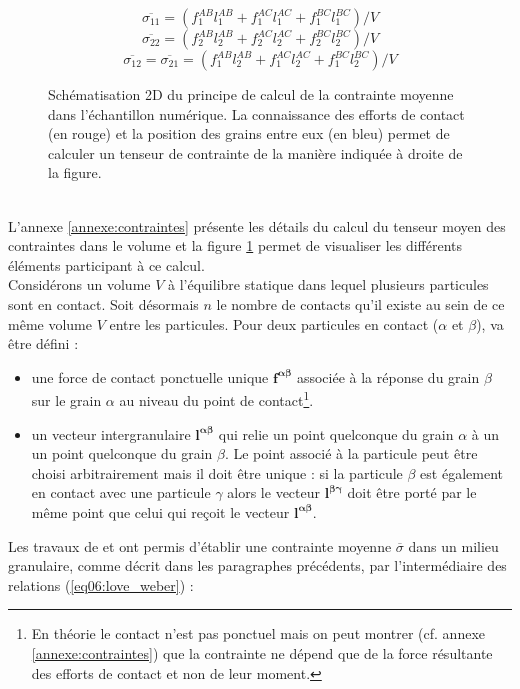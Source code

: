\begin{figure}
\begin{minipage}{0.44\textwidth}
			\end{minipage}
			\begin{minipage}{0.55\textwidth}\centering
				$$ \overline{\sigma_{11}} = \left( f_1^{AB}l_1^{AB} + f_1^{AC}l_1^{AC} + f_1^{BC}l_1^{BC} \right)/V $$
				$$ \overline{\sigma_{22}} = \left( f_2^{AB}l_2^{AB} + f_2^{AC}l_2^{AC} + f_2^{BC}l_2^{BC} \right)/V $$
				$$ \overline{\sigma_{12}} = \overline{\sigma_{21}} = \left( f_1^{AB}l_2^{AB} + f_1^{AC}l_2^{AC} + f_1^{BC}l_2^{BC} \right)/V $$
			\end{minipage}
			\caption{\label{fig06:contrainte_moyenne}Schématisation 2D du principe de calcul de la contrainte moyenne dans l'échantillon numérique. La connaissance des efforts de contact (en rouge) et la position des grains entre eux (en bleu) permet de calculer un tenseur de contrainte de la manière indiquée à droite de la figure.}
		\end{figure}
		\\L'annexe \ref{annexe:contraintes} présente les détails du calcul du tenseur moyen des contraintes dans le volume et la figure \ref{fig06:contrainte_moyenne} permet de visualiser les différents éléments participant à ce calcul.
		\\Considérons un volume $V$ à l'équilibre statique dans lequel plusieurs particules sont en contact. Soit désormais $n$ le nombre de contacts qu'il existe au sein de ce même volume $V$ entre les particules. Pour deux particules en contact ($\alpha$ et $\beta$), va être défini :
		\begin{itemize}
			\item une force de contact ponctuelle unique $\bm{f^{\alpha\beta}}$ associée à la réponse du grain $\beta$ sur le grain $\alpha$ au niveau du point de contact\footnote{En théorie le contact n'est pas ponctuel mais on peut montrer (cf. annexe \ref{annexe:contraintes}) que la contrainte ne dépend que de la force résultante des efforts de contact et non de leur moment.}.
			\item un vecteur intergranulaire $\bm{l^{\alpha\beta}}$ qui relie un point quelconque du grain $\alpha$ à un un point quelconque du grain $\beta$. Le point associé à la particule peut être choisi arbitrairement mais il doit être unique : si la particule $\beta$ est également en contact avec une particule $\gamma$ alors le vecteur $\bm{l^{\beta\gamma}}$ doit être porté par le même point que celui qui reçoit le vecteur $\bm{l^{\alpha\beta}}$.
		\end{itemize}
		Les travaux de \citet{love_treatise_1927} et \citet{weber_recherches_1966} ont permis d'établir une contrainte moyenne $\overline{\sigma}$ dans un milieu granulaire, comme décrit dans les paragraphes précédents, par l'intermédiaire des relations (\ref{eq06:love_weber}) :
